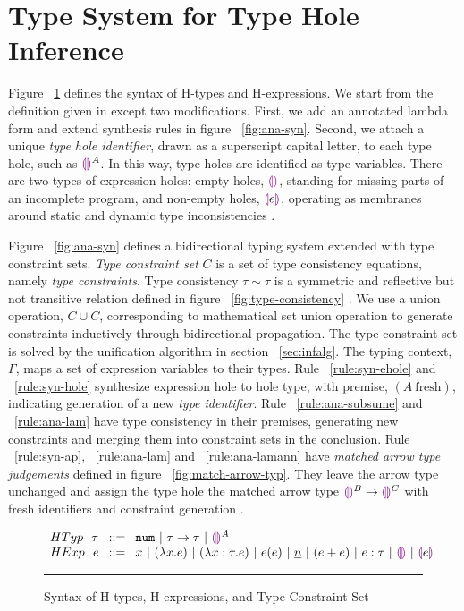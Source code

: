 \section{Type System for Type Hole Inference}
\label{sec:typinf}
Figure ~\ref{fig:syntax_fig} defines the syntax of H-types and H-expressions. We start from the definition given in \citet{HazelnutPOPL} except two modifications. First, we add an annotated lambda form and extend synthesis rules in figure ~\ref{fig:ana-syn}. Second, we attach a unique \emph{type hole identifier}, drawn as a superscript capital letter, to each type hole, such as $\textcolor{violet}{\llparenthesis}\textcolor{violet}{\rrparenthesis}^A$. In this way, type holes are identified as type variables. There are two types of expression holes: empty holes, $\textcolor{violet}{\llparenthesis}\textcolor{violet}{\rrparenthesis}$, standing for missing parts of an incomplete program, and non-empty holes, $\textcolor{violet}{\llparenthesis} e \textcolor{violet}{\rrparenthesis}$, operating as membranes around static and dynamic type inconsistencies \cite{HazelLive}. \par
Figure ~\ref{fig:ana-syn} defines a bidirectional typing system extended with type constraint sets. \emph{Type constraint set} $C$ is a set of type consistency equations, namely \emph{type constraints}. Type consistency $\tau \sim \tau$ is a symmetric and reflective but not transitive relation defined in figure ~\ref{fig:type-consistency} \cite{HazelnutPOPL}. We use a union operation, $C \cup C$, corresponding to mathematical set union operation to generate constraints inductively through bidirectional propagation. The type constraint set is solved by the unification algorithm in section ~\ref{sec:infalg}. The typing context, $\Gamma$, maps a set of expression variables to their types. Rule ~\ref{rule:syn-ehole} and ~\ref{rule:syn-hole} synthesize expression hole to hole type, with premise, $(A ~ \text{fresh})$, indicating generation of a new \emph{type identifier}. Rule ~\ref{rule:ana-subsume} and ~\ref{rule:ana-lam} have type consistency in their premises, generating new constraints and merging them into constraint sets in the conclusion. Rule ~\ref{rule:syn-ap}, ~\ref{rule:ana-lam} and ~\ref{rule:ana-lamann} have \emph{matched arrow type judgements} defined in figure ~\ref{fig:match-arrow-typ}. They leave the arrow type unchanged and assign the type hole the matched arrow type $\textcolor{violet}{\llparenthesis}\textcolor{violet}{\rrparenthesis}^B \rightarrow \textcolor{violet}{\llparenthesis}\textcolor{violet}{\rrparenthesis}^C$ with fresh identifiers and constraint generation \cite{HazelnutPOPL}.
\begin{figure}
$\arraycolsep=4pt\begin{array}{lll}
HTyp~~ \tau & ::= &
  \tnum ~\vert~
  \tarr{\tau}{\tau} ~\vert~
  \ehole^A
  \\
HExp~~ e & ::= &
  x ~\vert~
  \lamfunc{x}{e} ~\vert~
  \lamfunc{x:\tau}{e} ~\vert~
  e(e) ~\vert~
  \underlinenum{n} ~\vert~
  (e+e) ~\vert~
  e: \tau ~\vert~
  \ehole  ~\vert~
  \notehole{e} 
\end{array}$
\hrule
\caption{Syntax of H-types, H-expressions, and Type Constraint Set}
\label{fig:syntax_fig}
\vspace{-5px}
\end{figure}
